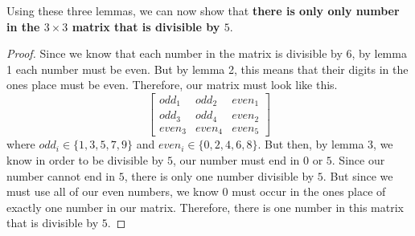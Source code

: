 \documentclass[12pt]{article}
\begin{document}
Using these three lemmas, we can now show that \textbf{there is only only number in the $3\times3$ matrix that is divisible by $5$}. 
\begin{proof}

Since we know that each number in the matrix is divisible by $6$, by lemma 1 each number must be even. But by lemma 2, this means that their digits in the ones place must be even. Therefore, our matrix must look like this. 
$$
\begin{bmatrix}
odd_1 & odd_2 & even_1\\
odd_3 & odd_4 & even_2\\
even_3 & even_4 & even_5
\end{bmatrix}
$$
where $odd_i \in \{1,3,5,7,9\}$ and $even_i \in \{0,2,4,6,8\}$. But then, by lemma 3, we know in order to be divisible by $5$, our number must end in $0$ or $5$. Since our number cannot end in $5$, there is only one number divisible by $5$. But since we must use all of our even numbers, we know $0$ must occur in the ones place of exactly one number in our matrix. Therefore, there is one number in this matrix that is divisible by $5$. 

\end{proof}
\end{document}
